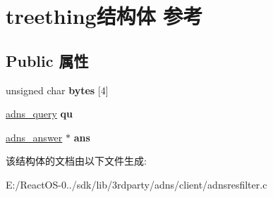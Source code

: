 \hypertarget{structtreething}{}\section{treething结构体 参考}
\label{structtreething}
\subsection*{Public 属性}
\begin{DoxyCompactItemize}
\item 
\mbox{\label{structtreething_aba29427547b2ce8286462398cdfd0ac3}} 
unsigned char {\bfseries bytes} \mbox{[}4\mbox{]}
\item 
\mbox{\label{structtreething_a14b088ecd746077118ebf520897a87b1}} 
\hyperlink{structadns____query}{adns\+\_\+query} {\bfseries qu}
\item 
\mbox{\label{structtreething_a9bae4f92fb341cc6d7e1872c1ff8975f}} 
\hyperlink{structadns__answer}{adns\+\_\+answer} $\ast$ {\bfseries ans}
\end{DoxyCompactItemize}


该结构体的文档由以下文件生成\+:\begin{DoxyCompactItemize}
\item 
E\+:/\+React\+O\+S-\/0../sdk/lib/3rdparty/adns/client/adnsresfilter.\+c\end{DoxyCompactItemize}
